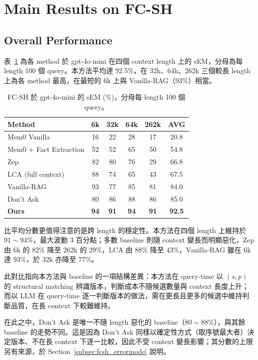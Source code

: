  
\section{Main Results on FC-SH}
\label{sec:main_fcsh}
 
\subsection{Overall Performance}
\label{subsec:fcsh_overall}
表~\ref{tab:fcsh_main} 為各 method 於 gpt-4o-mini 在四個 context length 上的 sEM，分母為每 length 100 個 query。本方法平均達 92.5\%，在 32k、64k、262k 三個較長 length 上為各 method 最高，在最短的 6k 上與 Vanilla-RAG（93\%）相當。
 
\begin{table}[!htb]
\centering
\caption{FC-SH 於 gpt-4o-mini 的 sEM (\%)，分母每 length 100 個 query。}
\label{tab:fcsh_main}
\small
\begin{tabular}{lccccc}
\toprule
Method & 6k & 32k & 64k & 262k & AVG \\
\midrule
Mem0 Vanilla & 16 & 22 & 28 & 17 & 20.8 \\
Mem0 + Fact Extraction & 52 & 52 & 65 & 50 & 54.8 \\
Zep & 82 & 80 & 76 & 29 & 66.8 \\
LCA (full context) & 88 & 74 & 65 & 43 & 67.5 \\
Vanilla-RAG & 93 & 77 & 85 & 81 & 84.0 \\
Don't Ask & 80 & 86 & 88 & 86 & 85.0 \\
\midrule
\textbf{Ours} & \textbf{94} & \textbf{91} & \textbf{94} & \textbf{91} & \textbf{92.5} \\
\bottomrule
\end{tabular}
\end{table}
 
比平均分數更值得注意的是跨 length 的穩定性。本方法在四個 length 上維持於 $91\sim94\%$，最大波動 3 百分點；多數 baseline 則隨 context 變長而明顯惡化，Zep 由 6k 的 82\% 降至 262k 的 29\%，LCA 由 88\% 降至 43\%，Vanilla-RAG 雖在 6k 達 93\%，於 32k 亦降至 77\%。
 
此對比指向本方法與 baseline 的一項結構差異：本方法在 query-time 以 $(s, p)$ 的 structural matching 辨識版本，判斷成本不隨候選數量與 context 長度上升；而以 LLM 在 query-time 逐一判斷版本的做法，需在更長且更多的候選中維持判斷品質，在長 context 下較難維持。
 
在此之中，Don't Ask 是唯一不隨 length 惡化的 baseline（$80\sim88\%$），與其餘 baseline 的走勢不同。這是因為 Don't Ask 同樣以確定性方式（取序號最大者）決定版本、不在長 context 下逐一比較，因此不受 context 變長影響；其分數的上限另有來源，於 Section~\ref{subsec:fcsh_errormode} 說明。
 
